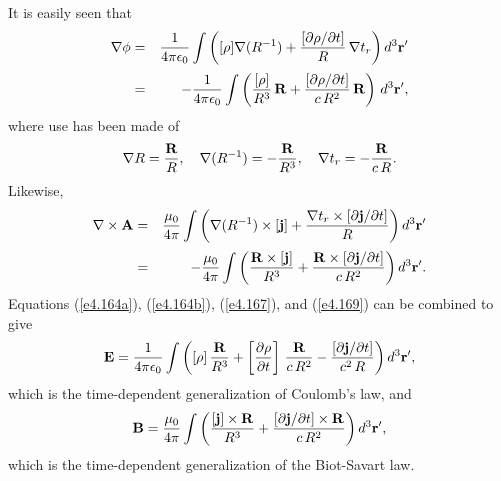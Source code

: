 It is easily seen that
\begin{eqnarray}
\nabla\phi &=& \frac{1}{4\pi\epsilon_0}\int \left(
[\rho] \nabla(R^{-1}) + \frac{[\partial\rho/\partial t]}{R}\, \nabla t_r\right)d^3{\bf r}'
\nonumber\\[0.5ex]
&=& - \frac{1}{4\pi\epsilon_0} \int \left(
\frac{[\rho]}{R^3}\,{\bf R}  + \frac{[\partial\rho/\partial t]}{c\,R^2}\,{\bf R} \right) \,d^3{\bf r}',\label{e4.167}
\end{eqnarray}
where use has been made of
\begin{equation}
\nabla R = \frac{\bf R}{R},~~~\nabla( R^{-1})= - \frac{\bf R}{R^3},~~~\nabla t_r = - \frac{\bf R}{c\,R}.
\end{equation}
Likewise, 
\begin{eqnarray}
\nabla\times{\bf A} &= &\frac{\mu_0}{4\pi} \int \left(
\nabla(R^{-1}) \times [{\bf j}] + \frac{\nabla t_r\times [\partial {\bf j}/\partial t]}{R}
\right)d^3{\bf r}'\nonumber\\[0.5ex]
&=& -\frac{\mu_0}{4\pi} \int \left( \frac{{\bf R} \times [{\bf j}]}{R^3} +
\frac{{\bf R} \times [\partial {\bf j}/\partial t]}{c\,R^2} \right)d^3{\bf r}'.\label{e4.169}
\end{eqnarray}
Equations (\ref{e4.164a}), (\ref{e4.164b}), (\ref{e4.167}), and (\ref{e4.169}) can be combined to give
\begin{equation}\label{e4.172}
{\bf E} = \frac{1}{4\pi\epsilon_0} \int \left(
[\rho] \,\frac{\bf R}{R^3} + \left[\frac{\partial\rho}{\partial t}\right]\, \frac{\bf R}{c\,R^2}
- \frac{[\partial {\bf j}/\partial t]}{c^2 \,R} \right)d^3{\bf r}',
\end{equation}
which is the time-dependent generalization of Coulomb's law, 
and
\begin{equation}\label{e4.173}
{\bf B} = \frac{\mu_0}{4\pi} \int \left(
\frac{ [{\bf j}]\times {\bf R} }{R^3} + \frac{ [\partial {\bf j}/\partial t]\times {\bf R} }
{c\,R^2} \right)d^3{\bf r}',
\end{equation}
which is the time-dependent generalization of the Biot-Savart law.


